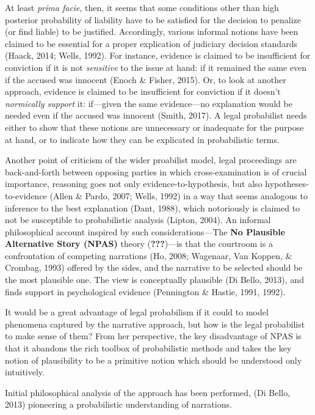 \documentclass[11pt,dvipsnames,enabledeprecatedfontcommands]{scrartcl}
\begin{document}
At least \emph{prima facie}, then, it seems that some conditions other
than high posterior probability of liability have to be satisfied for
the decision to penalize (or find liable) to be justified. Accordingly,
various informal notions have been claimed to be essential for a proper
explication of judiciary decision standards (Haack, 2014; Wells, 1992).
For instance, evidence is claimed to be insufficient for conviction if
it is not \emph{sensitive} to the issue at hand: if it remained the same
even if the accused was innocent (Enoch \& Fisher, 2015). Or, to look at
another approach, evidence is claimed to be insufficient for conviction
if it doesn't \emph{normically support} it: if---given the same
evidence---no explanation would be needed even if the accused was
innocent (Smith, 2017). A legal probabilist needs either to show that
these notions are unnecessary or inadequate for the purpose at hand, or
to indicate how they can be explicated in probabilistic terms.


Another point of criticism of the wider proabilist model, legal
proceedings are back-and-forth between opposing parties in which
cross-examination is of crucial importance, reasoning goes not only
evidence-to-hypothesis, but also hypotheses-to-evidence (Allen \& Pardo,
2007; Wells, 1992) in a way that seems analogous to inference to the
best explanation (Dant, 1988), which notoriously is claimed to not be
susceptible to probabilistic analysis (Lipton, 2004). An informal
philosophical account inspired by such considerations---The
\textbf{No Plausible Alternative Story (NPAS)} theory
({\textbf{???}})---is that the courtroom is a confrontation of competing
narrations (Ho, 2008; Wagenaar, Van Koppen, \& Crombag, 1993) offered by
the sides, and the narrative to be selected should be the most plausible
one. The view is conceptually plausible (Di Bello, 2013), and finds
support in psychological evidence (Pennington \& Hastie, 1991, 1992).

It would be a great advantage of legal probabilism if it could to model
phenomena captured by the narrative approach, but how is the legal
probabilist to make sense of them? From her perspective, the key
disadvantage of NPAS is that it abandons the rich toolbox of
probabilistic methods and takes the key notion of plausibility to be a
primitive notion which should be understood only intuitively.

Initial philosophical analysis of the approach has been performed, (Di
Bello, 2013) pioneering a probabilistic understanding of narrations.
\end{document}
